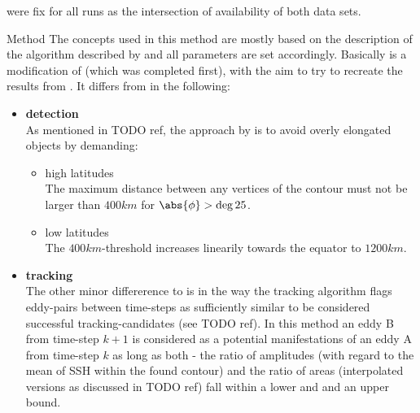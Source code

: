  were fix for all runs as the intersection of availability of both data sets.





\begin{cbox}{Method \MI}\label{box:MI}
The concepts used in this method are mostly based on the description of the algorithm described by \citet{Chelton2011} and all parameters are set accordingly. Basically \MI is a modification of \MII (which was completed first), with the aim to try to recreate the results from \citep{Chelton2011}.
It differs from \MII in the following:
\begin{itemize}
	\item \textbf{detection}\\
As mentioned in TODO ref, the approach by \citet{Chelton2011} is to avoid overly elongated objects by demanding:
\begin{itemize}
	\item high latitudes\\
	The maximum distance between any vertices of the contour must not be larger than $400km$ for $\abs{\phi}>\deg{25}$.
	\item low latitudes\\
The $400km$-threshold increases linearily towards the equator to $1200km$.
\end{itemize}
	\item \textbf{tracking}\\
The other minor differerence to \MII is in the way the tracking algorithm flags eddy-pairs between time-steps as sufficiently similar to be considered successful tracking-candidates (see TODO ref).
In this method an eddy B from time-step $k+1$ is considered as a potential manifestations of an eddy A from time-step $k$ as long as both - the ratio of amplitudes (with regard to the mean of SSH within the found contour) and the ratio of areas (interpolated versions as discussed in TODO ref) fall within a lower and and an upper bound.
\end{itemize}
\end{cbox}


